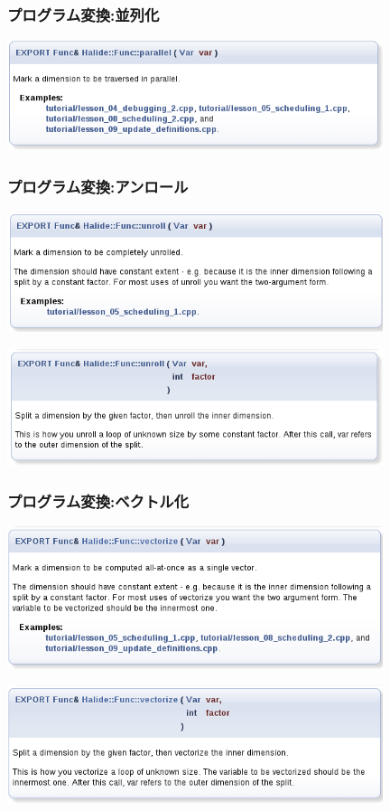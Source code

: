 \documentclass[dvipdfmx,cjk]{beamer}
\begin{document}
\begin{frame}\frametitle{プログラム変換:並列化}
\begin{center}\includegraphics[width=11cm]{figure/doc/schedule-parallel.png}\end{center}\end{frame}

\begin{frame}\frametitle{プログラム変換:アンロール}
\begin{center}\includegraphics[width=11cm]{figure/doc/schedule-unroll.png}

\includegraphics[width=11cm]{figure/doc/schedule-unroll2.png}
\end{center}\end{frame}

\begin{frame}\frametitle{プログラム変換:ベクトル化}
\begin{center}\includegraphics[width=11cm]{figure/doc/schedule-vectorize.png}

\includegraphics[width=11cm]{figure/doc/schedule-vectorize2.png}
\end{center}\end{frame}
\end{document}
